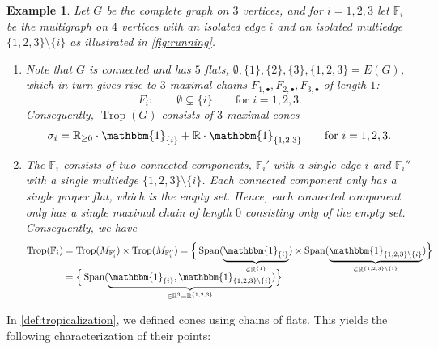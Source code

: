\documentclass[11pt,reqno,a4paper]{amsart}
\theoremstyle{theoremstyle}
\theoremstyle{examplestyle}
\newtheorem{example}[theorem]{Example}
\theoremstyle{algorithmstyle}
\newcommand{\FF}{\mathbb{F}}
\newcommand{\RR}{\mathbb{R}}
\newcommand{\bbone}{\mathbbm{1}}
\DeclareMathOperator{\Span}{Span}
\DeclareMathOperator{\Trop}{Trop}
\begin{document}
\begin{example}
  \label{ex:tropicalization}
  Let $G$ be the complete graph on $3$ vertices, and for $i=1,2,3$ let $\FF_i$ be the multigraph on $4$ vertices with an isolated edge $i$ and an isolated multiedge $\{1,2,3\}\setminus \{i\}$ as illustrated in \cref{fig:running}.
  \begin{enumerate}
  \item Note that $G$ is connected and has $5$ flats, $\emptyset, \{1\}, \{2\}, \{3\}, \{1,2,3\}=E(G)$, which in turn gives rise to $3$ maximal chains $F_{1,\bullet},F_{2,\bullet},F_{3,\bullet}$ of length $1$:
    \begin{equation*}
      F_i\colon \qquad \emptyset\subsetneq \{i\} \qquad\text{for }i=1,2,3.
    \end{equation*}
    Consequently, $\Trop(G)$ consists of $3$ maximal cones
    \begin{equation*}
      \sigma_i=\RR_{\geq 0}\cdot \bbone_{\{i\}} + \RR\cdot \bbone_{\{1,2,3\}} \qquad\text{for }i=1,2,3.
    \end{equation*}
  \item The $\FF_i$ consists of two connected components, $\FF_i'$ with a single edge $i$ and $\FF_i''$ with a single multiedge $\{1,2,3\}\setminus\{i\}$.  Each connected component only has a single proper flat, which is the empty set. Hence, each connected component only has a single maximal chain of length $0$ consisting only of the empty set.
    Consequently, we have
    \begin{align*}
      \Trop(\FF_i) &= \Trop(M_{\FF_i'})\times\Trop(M_{\FF_i''}) = \Big\{\Span(\underbrace{\bbone_{\{i\}}}_{\in\RR^{\{1\}}})\times\Span(\underbrace{\bbone_{\{1,2,3\}\setminus\{i\}}}_{\in\RR^{\{1,2,3\}\setminus\{i\}}})\Big\}\\[-3mm]
                   &=\Big\{\Span(\underbrace{\bbone_{\{i\}},\bbone_{\{1,2,3\}\setminus\{i\}}}_{\in\RR^3=\RR^{\{1,2,3\}}})\Big\}
    \end{align*}
  \end{enumerate}
\end{example}

In \cref{def:tropicalization}, we defined cones using chains of flats.  This yields the following characterization of their points:
\end{document}

